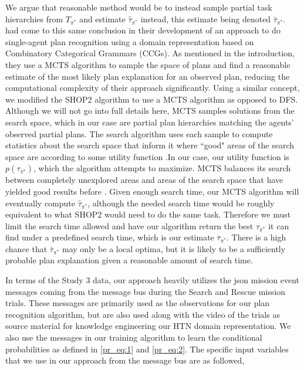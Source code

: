 We argue that reasonable method would be to instead sample partial task hierarchies from $T_{\pi^*}$ and estimate $\hat{\tau}_{\pi^*}$ instead, this estimate being denoted $\bar{\tau}_{\pi^*}$. \citet{Kantharaju_Ontanon_Geib_2019} had come to this same conclusion in their development of an approach to do single-agent plan recognition using a domain representation based on Combinatory Categorical Grammars (CCGs). As mentioned in the introduction, they use a MCTS algorithm to sample the space of plans and find a reasonable estimate of the most likely plan explanation for an observed plan, reducing the computational complexity of their approach significantly. Using a similar concept, we modified the SHOP2 algorithm to use a MCTS algorithm as opposed to DFS. Although we will not go into full details here, MCTS samples solutions from the search space, which in our case are partial plan hierarchies matching the agents' observed partial plans. The search algorithm uses each sample to compute statistics about the search space that inform it where ``good" areas of the search space are according to some utility function \citep{Browne_Powley_Whitehouse_Lucas_Cowling_Rohlfshagen_Tavener_Perez_Samothrakis_Colton_2012,Kantharaju_Ontanon_Geib_2019}.In our case, our utility function is $p(\tau_{\pi^*})$, which the algorithm attempts to maximize. MCTS balances its search between completely unexplored areas and areas of the search space that have yielded good results before \citep{Browne_Powley_Whitehouse_Lucas_Cowling_Rohlfshagen_Tavener_Perez_Samothrakis_Colton_2012,Kantharaju_Ontanon_Geib_2019}. Given enough search time, our MCTS algorithm will eventually compute $\hat{\tau}_{\pi^*}$, although the needed search time would be roughly equivalent to what SHOP2 would need to do the same task. Therefore we must limit the search time allowed and have our algorithm return the best $\tau_{\pi^*}$ it can find under a predefined search time, which is our estimate $\bar{\tau}_{\pi^*}$. There is a high chance that $\bar{\tau}_{\pi^*}$ may only be a local optima, but it is likely to be a sufficiently probable plan explanation given a reasonable amount of search time.

In terms of the Study 3 data, our approach heavily utilizes the json mission event messages coming from the message bus during the Search and Rescue mission trials. These messages are primarily used as the observations for our plan recognition algorithm, but are also used along with the video of the trials as source material for knowledge engineering our HTN domain representation. We also use the messages in our training algorithm to learn the conditional probabilities as defined in \ref{pr_eq:1} and \ref{pr_eq:2}. The specific input variables that we use in our approach from the message bus are as followed,

